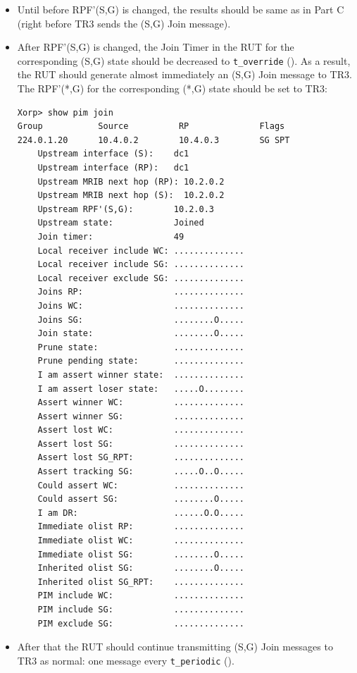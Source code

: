 \documentclass[11pt]{report}
\begin{document}
\begin{itemize}

  \item Until before RPF'(S,G) is changed, the results should
  be same as in Part C (right before TR3 sends the (S,G) Join message).

  \item After RPF'(S,G) is changed,
  the Join Timer in the RUT for the corresponding (S,G) state
  should be decreased to \verb=t_override= ({\PimsmTOverride}). As a result,
  the RUT should generate almost immediately an (S,G) Join message to TR3.
  The RPF'(*,G) for the corresponding (*,G) state should be set to TR3:

\begin{verbatim}
Xorp> show pim join
Group           Source          RP              Flags
224.0.1.20      10.4.0.2        10.4.0.3        SG SPT 
    Upstream interface (S):    dc1
    Upstream interface (RP):   dc1
    Upstream MRIB next hop (RP): 10.2.0.2
    Upstream MRIB next hop (S):  10.2.0.2
    Upstream RPF'(S,G):        10.2.0.3
    Upstream state:            Joined 
    Join timer:                49
    Local receiver include WC: ..............
    Local receiver include SG: ..............
    Local receiver exclude SG: ..............
    Joins RP:                  ..............
    Joins WC:                  ..............
    Joins SG:                  ........O.....
    Join state:                ........O.....
    Prune state:               ..............
    Prune pending state:       ..............
    I am assert winner state:  ..............
    I am assert loser state:   .....O........
    Assert winner WC:          ..............
    Assert winner SG:          ..............
    Assert lost WC:            ..............
    Assert lost SG:            ..............
    Assert lost SG_RPT:        ..............
    Assert tracking SG:        .....O..O.....
    Could assert WC:           ..............
    Could assert SG:           ........O.....
    I am DR:                   ......O.O.....
    Immediate olist RP:        ..............
    Immediate olist WC:        ..............
    Immediate olist SG:        ........O.....
    Inherited olist SG:        ........O.....
    Inherited olist SG_RPT:    ..............
    PIM include WC:            ..............
    PIM include SG:            ..............
    PIM exclude SG:            ..............
\end{verbatim}

  \item After that the RUT should continue transmitting 
  (S,G) Join messages to TR3 as normal: one message every \verb=t_periodic=
  ({\PimsmTPeriodic}).

\end{itemize}
\end{document}
